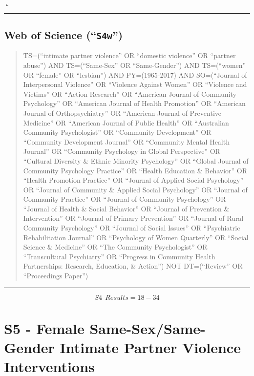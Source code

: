 \documentclass[]{tufte-handout}
\newcommand{\Rerule}{
    \noindent
    \hspace{-1em}
    \textcolor{Rblue}{
        $\llcorner$\rule[-0.4mm]{\linewidth}{0.02mm}
    }
}
\begin{document}
\Rerule

\subsection{\texorpdfstring{Web of Science
(``\texttt{S4w}'')}{Web of Science (S4w)}}\label{web-of-science-s4w}

\begin{quote}
TS=(``intimate partner violence'' OR ``domestic violence'' OR ``partner
abuse'') AND TS=(``Same-Sex'' OR ``Same-Gender'') AND TS=(``women'' OR
``female'' OR ``lesbian'') AND PY=(1965-2017) AND SO=(``Journal of
Interpersonal Violence'' OR ``Violence Against Women'' OR ``Violence and
Victims'' OR ``Action Research'' OR ``American Journal of Community
Psychology'' OR ``American Journal of Health Promotion'' OR ``American
Journal of Orthopsychiatry'' OR ``American Journal of Preventive
Medicine'' OR ``American Journal of Public Health'' OR ``Australian
Community Psychologist'' OR ``Community Development'' OR ``Community
Development Journal'' OR ``Community Mental Health Journal'' OR
``Community Psychology in Global Perspective'' OR ``Cultural Diversity
\& Ethnic Minority Psychology'' OR ``Global Journal of Community
Psychology Practice'' OR ``Health Education \& Behavior'' OR ``Health
Promotion Practice'' OR ``Journal of Applied Social Psychology'' OR
``Journal of Community \& Applied Social Psychology'' OR ``Journal of
Community Practice'' OR ``Journal of Community Psychology'' OR ``Journal
of Health \& Social Behavior'' OR ``Journal of Prevention \&
Intervention'' OR ``Journal of Primary Prevention'' OR ``Journal of
Rural Community Psychology'' OR ``Journal of Social Issues'' OR
``Psychiatric Rehabilitation Journal'' OR ``Psychology of Women
Quarterly'' OR ``Social Science \& Medicine'' OR ``The Community
Psychologist'' OR ``Transcultural Psychiatry'' OR ``Progress in
Community Health Partnerships: Research, Education, \& Action'') NOT
DT=(``Review'' OR ``Proceedings Paper'')
\end{quote}

\begin{center}\rule{0.5\linewidth}{\linethickness}\end{center}

\[ S4~~Results = 18-34 \]

\newpage

\section{S5 - Female Same-Sex/Same-Gender Intimate Partner Violence
Interventions}\label{s5---female-same-sexsame-gender-intimate-partner-violence-interventions}
\end{document}
